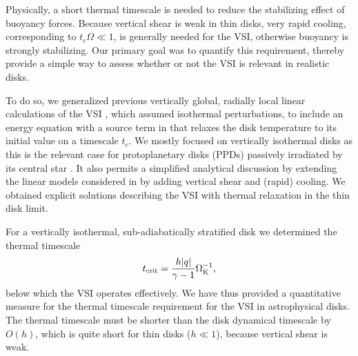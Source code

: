 Physically, a short thermal timescale is needed to reduce the  
stabilizing effect of buoyancy forces. Because vertical shear is weak
in thin disks, very rapid cooling, corresponding to $t_c\Omega\ll 1$, 
is generally needed for the VSI, otherwise buoyancy is strongly
stabilizing. Our primary goal was to quantify this requirement,
thereby provide a simple way to assess whether or not the VSI is
relevant in realistic disks.  

To do so, we generalized previous vertically global, radially local linear 
calculations of the VSI , which
assumed isothermal perturbations, to include an energy equation with 
a source term in that relaxes the disk 
temperature to its initial value on a timescale
$t_c$. 
We mostly focused on vertically isothermal disks as this is the
relevant case for protoplanetary disks (PPDs) passively 
irradiated by its central star \citep{chiang97}. It also permits a
simplified analytical discussion by extending the 
linear models considered in \cite{lubow93} by adding vertical shear
and (rapid) cooling. We obtained explicit solutions 
describing the VSI with thermal relaxation in the thin disk limit.  

For a vertically isothermal, sub-adiabatically stratified disk we
determined the thermal timescale   
\begin{align*}
  t_\mathrm{crit} = \frac{ h |q|}{\gamma-1}\Omega_{\rm K}^{-1}, 
\end{align*}
below which the VSI operates effectively. 
We have thus provided a quantitative measure for the thermal
timescale requirement for the VSI in astrophysical 
disks. The thermal timescale must be shorter than the disk
dynamical timescale by $O( h)$, which is 
quite short for thin disks ($ h\ll 1$), because vertical shear is weak.    

